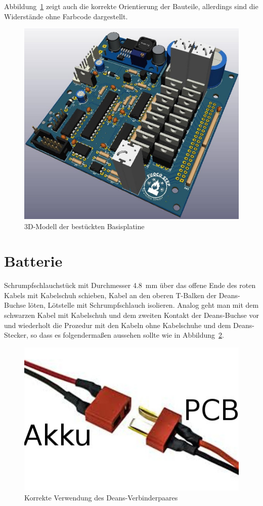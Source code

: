 \documentclass[paper=a4, open=any, numbers=noenddot]{scrbook}
\begin{document}
				Abbildung~\ref{fig:base3d} zeigt auch die korrekte Orientierung der Bauteile, allerdings sind die Widerstände ohne Farbcode dargestellt.

				\begin{figure}[H]
					\centering\includegraphics[width=.7\textwidth]{Bilder/base3d}
					\caption{3D-Modell der bestückten Basisplatine}
					\label{fig:base3d}
				\end{figure}

		\section{Batterie}

			Schrumpfschlauchstück mit Durchmesser \SI{4,8}{\milli\metre} über das offene Ende des roten Kabels mit Kabelschuh schieben, Kabel an den oberen T-Balken der Deans-Buchse löten, Lötstelle mit Schrumpfschlauch isolieren. Analog geht man mit dem schwarzen Kabel mit Kabelschuh und dem zweiten Kontakt der Deans-Buchse vor und wiederholt die Prozedur mit den Kabeln ohne Kabelschuhe und dem Deans-Stecker, so dass es folgendermaßen aussehen sollte wie in Abbildung~\ref{fig:deans}.

			\begin{figure}
				\centering\includegraphics[width=.35\textwidth]{Bilder/deans}
				\caption{Korrekte Verwendung des Deans-Verbinder\-paares}
				\label{fig:deans}
			\end{figure}
\end{document}
